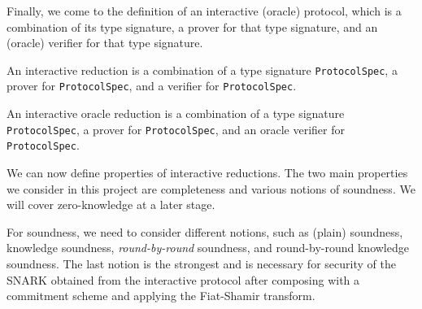 \begin{definition}
    \label{def:verifier_type_signature}
    
\end{definition}

\begin{definition}
    \label{def:oracle_verifier_type_signature}
\end{definition}

Finally, we come to the definition of an interactive (oracle) protocol, which is a combination of its type signature, a prover for that type signature, and an (oracle) verifier for that type signature.

\begin{definition}
    \label{def:interactive_reduction}
    An interactive reduction is a combination of a type signature \verb|ProtocolSpec|, a prover for \verb|ProtocolSpec|, and a verifier for \verb|ProtocolSpec|.
\end{definition}

\begin{definition}
    \label{def:interactive_oracle_reduction}
    An interactive oracle reduction is a combination of a type signature \verb|ProtocolSpec|, a prover for \verb|ProtocolSpec|, and an oracle verifier for \verb|ProtocolSpec|.
\end{definition}

We can now define properties of interactive reductions. The two main properties we consider in this project are completeness and various notions of soundness. We will cover zero-knowledge at a later stage.

\begin{definition}[Completeness]
    \label{def:completeness}
\end{definition}

For soundness, we need to consider different notions, such as (plain) soundness, knowledge soundness, \emph{round-by-round} soundness, and round-by-round knowledge soundness. The last notion is the strongest and is necessary for security of the SNARK obtained from the interactive protocol after composing with a commitment scheme and applying the Fiat-Shamir transform.

\begin{definition}[Soundness]
    \label{def:soundness}
\end{definition}

